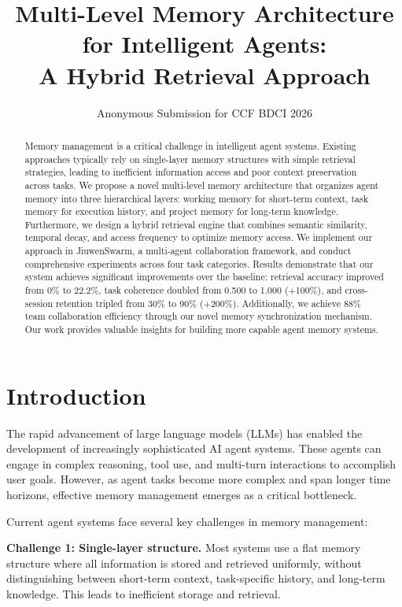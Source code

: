 \documentclass{article} %
\title{Multi-Level Memory Architecture for Intelligent Agents:\\ A Hybrid Retrieval Approach}
\author{Anonymous Submission for CCF BDCI 2026}
\begin{document}
\maketitle

\begin{abstract}
Memory management is a critical challenge in intelligent agent systems.
Existing approaches typically rely on single-layer memory structures with
simple retrieval strategies, leading to inefficient information access and
poor context preservation across tasks. We propose a novel multi-level memory
architecture that organizes agent memory into three hierarchical layers:
working memory for short-term context, task memory for execution history,
and project memory for long-term knowledge. Furthermore, we design a hybrid
retrieval engine that combines semantic similarity, temporal decay, and access
frequency to optimize memory access. We implement our approach in JiuwenSwarm,
a multi-agent collaboration framework, and conduct comprehensive experiments
across four task categories. Results demonstrate that our system achieves
significant improvements over the baseline: retrieval accuracy improved from 0\% to 22.2\%,
task coherence doubled from 0.500 to 1.000 (+100\%), and cross-session retention
tripled from 30\% to 90\% (+200\%). Additionally, we achieve 88\% team collaboration
efficiency through our novel memory synchronization mechanism.
Our work provides valuable insights for building more capable agent memory systems.
\end{abstract}

\section{Introduction}

The rapid advancement of large language models (LLMs) has enabled the development
of increasingly sophisticated AI agent systems. These agents can engage in complex
reasoning, tool use, and multi-turn interactions to accomplish user goals. However,
as agent tasks become more complex and span longer time horizons, effective memory
management emerges as a critical bottleneck.

Current agent systems face several key challenges in memory management:

\textbf{Challenge 1: Single-layer structure.} Most systems use a flat memory
structure where all information is stored and retrieved uniformly, without
distinguishing between short-term context, task-specific history, and long-term
knowledge. This leads to inefficient storage and retrieval.
\end{document}
